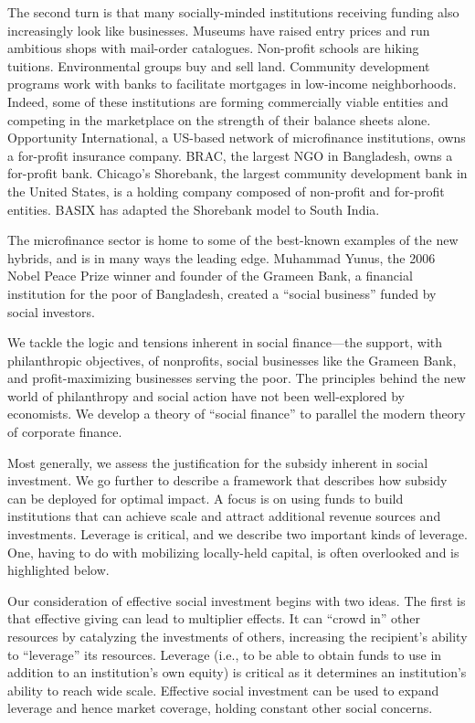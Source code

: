 \documentclass{article} %
\begin{document}
The second turn is that many socially-minded institutions receiving funding also increasingly look like businesses. Museums have raised entry prices and run ambitious shops with mail-order catalogues. Non-profit schools are hiking tuitions.  Environmental groups buy and sell land. Community development programs work with banks to facilitate mortgages in low-income neighborhoods. Indeed, some of these institutions are forming commercially viable entities and competing in the marketplace on the strength of their balance sheets alone. Opportunity International, a US-based network of microfinance institutions, owns a for-profit insurance company. BRAC, the largest NGO in Bangladesh, owns a for-profit bank. Chicago's Shorebank, the largest community development bank in the United States, is a holding company composed of non-profit and for-profit entities. BASIX has adapted the Shorebank model to South India. 

The microfinance sector is home to some of the best-known examples of the new hybrids, and is in many ways the leading edge. Muhammad Yunus, the 2006 Nobel Peace Prize winner and founder of the Grameen Bank, a financial institution for the poor of Bangladesh, created a ``social business'' funded by social investors. 

We tackle the logic and tensions inherent in social finance---the support, with philanthropic objectives, of nonprofits, social businesses like the Grameen Bank, and profit-maximizing businesses serving the poor. The principles behind the new world of philanthropy and social action have not been well-explored by economists. We develop a theory of ``social finance'' to parallel the modern theory of corporate finance. 

Most generally, we assess the justification for the subsidy inherent in social investment. We go further to describe a framework that describes how subsidy can be deployed for optimal impact. A focus is on using funds to build institutions that can achieve scale and attract additional revenue sources and investments. Leverage is critical, and we describe two important kinds of leverage. One, having to do with mobilizing locally-held capital, is often overlooked and is highlighted below. 

Our consideration of effective social investment begins with two ideas. The first is that effective giving can lead to multiplier effects. It can ``crowd in'' other resources by catalyzing the investments of others, increasing the recipient's ability to ``leverage'' its resources. Leverage (i.e., to be able to obtain funds to use in addition to an institution's own equity) is critical as it determines an institution's ability to reach wide scale. Effective social investment can be used to expand leverage and hence market coverage, holding constant other social concerns. 
\end{document}
